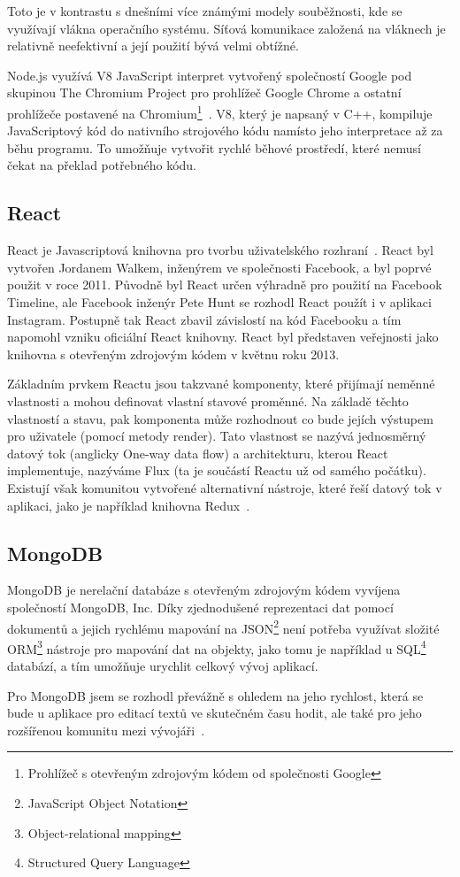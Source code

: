 Toto je v kontrastu s dnešními více známými modely souběžnosti, kde se využívají vlákna operačního systému.
Síťová komunikace založená na vláknech je relativně neefektivní a její použití bývá velmi obtížné.~\cite{node:about}

Node.js využívá V8 JavaScript interpret vytvořený společností Google pod skupinou The Chromium Project pro prohlížeč Google Chrome a ostatní prohlížeče postavené na Chromium\footnote{Prohlížeč s otevřeným zdrojovým kódem od společnosti Google}~\cite{node:es6}.
V8, který je napsaný v C++, kompiluje JavaScriptový kód do nativního strojového kódu namísto jeho interpretace až za běhu programu.
To umožňuje vytvořit rychlé běhové prostředí, které nemusí čekat na překlad potřebného kódu.~\cite{node:article2013}

\subsection{React}\label{subsec:reactjs}

React je Javascriptová knihovna pro tvorbu uživatelského rozhraní~\cite{react:about}.
React byl vytvořen Jordanem Walkem, inženýrem ve společnosti Facebook, a byl poprvé použit v roce 2011.
Původně byl React určen výhradně pro použití na Facebook Timeline, ale Facebook inženýr Pete Hunt se rozhodl React použít i v aplikaci Instagram.
Postupně tak React zbavil závislostí na kód Facebooku a tím napomohl vzniku oficiální React knihovny.
React byl představen veřejnosti jako knihovna s otevřeným zdrojovým kódem v květnu roku 2013.~\cite{react:author}

Základním prvkem Reactu jsou takzvané komponenty, které přijímají neměnné vlastnosti a mohou definovat vlastní stavové proměnné.
Na základě těchto vlastností a stavu, pak komponenta může rozhodnout co bude jejích výstupem pro uživatele (pomocí metody render).
Tato vlastnost se nazývá jednosměrný datový tok (anglicky One-way data flow) a architekturu, kterou React implementuje, nazýváme Flux (ta je součástí Reactu už od samého počátku).~\cite{react:about}
Existují však komunitou vytvořené alternativní nástroje, které řeší datový tok v aplikaci, jako je například knihovna Redux~\cite{react:redux}.

\subsection{MongoDB}\label{subsec:mongodb}
MongoDB je nerelační databáze s otevřeným zdrojovým kódem vyvíjena společností MongoDB, Inc.
Díky zjednodušené reprezentaci dat pomocí dokumentů a jejich rychlému mapování na JSON\footnote{JavaScript Object Notation} není potřeba využívat složité ORM\footnote{Object-relational mapping} nástroje pro mapování dat na objekty, jako tomu je například u SQL\footnote{Structured Query Language} databází, a tím umožňuje urychlit celkový vývoj aplikací.~\cite{mongo:about}

Pro MongoDB jsem se rozhodl převážně s ohledem na jeho rychlost, která se bude u aplikace pro editací textů ve skutečném času hodit, ale také pro jeho rozšířenou komunitu mezi vývojáři~\cite{mongo:speed,mongo:popularity}.

